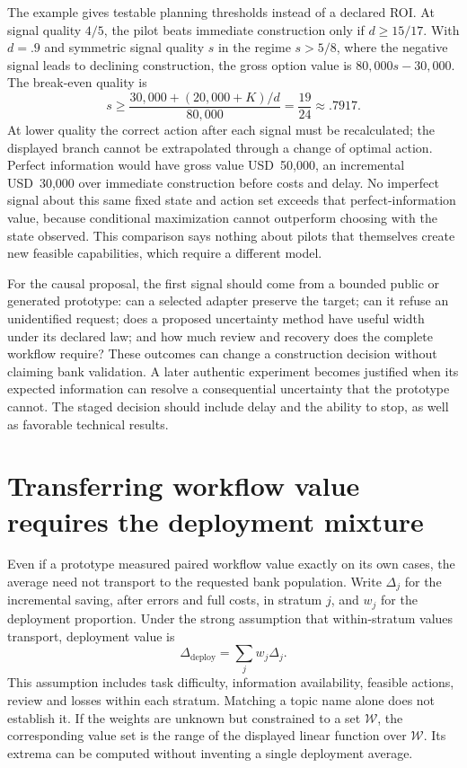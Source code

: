 The example gives testable planning thresholds instead of a declared ROI.
At signal quality $4/5$, the pilot beats immediate construction only if
$d\geq15/17$. With $d=.9$ and symmetric signal quality $s$ in the regime
$s>5/8$, where the negative signal leads to declining construction, the gross
option value is $80{,}000s-30{,}000$. The break-even quality is
\[
 s\geq \frac{30{,}000+(20{,}000+K)/d}{80{,}000}
       =\frac{19}{24}\approx.7917.
\]
At lower quality the correct action after each signal must be recalculated;
the displayed branch cannot be extrapolated through a change of optimal action.
Perfect information would have gross value USD~50,000, an incremental
USD~30,000 over immediate construction before costs and delay. No imperfect
signal about this same fixed state and action set exceeds that perfect-information
value, because conditional maximization cannot outperform choosing with the
state observed. This comparison says nothing about pilots that themselves
create new feasible capabilities, which require a different model.
\citep{exec14_l8_economics}

For the causal proposal, the first signal should come from a bounded public or
generated prototype: can a selected adapter preserve the target; can it refuse
an unidentified request; does a proposed uncertainty method have useful width
under its declared law; and how much review and recovery does the complete
workflow require? These outcomes can change a construction decision without
claiming bank validation. A later authentic experiment becomes justified when
its expected information can resolve a consequential uncertainty that the
prototype cannot. The staged decision should include delay and the ability to
stop, as well as favorable technical results. \citep{exec14_l8_design}

\section{Transferring workflow value requires the deployment mixture}
\label{exec14:l8-transfer}

Even if a prototype measured paired workflow value exactly on its own cases,
the average need not transport to the requested bank population. Write
$\Delta_j$ for the incremental saving, after errors and full costs, in stratum
$j$, and $w_j$ for the deployment proportion. Under the strong assumption that
within-stratum values transport, deployment value is
\[
 \Delta_{\mathrm{deploy}}=\sum_j w_j\Delta_j.
\]
This assumption includes task difficulty, information availability, feasible
actions, review and losses within each stratum. Matching a topic name alone
does not establish it. If the weights are unknown but constrained to a set
$\mathcal W$, the corresponding value set is the range of the displayed linear
function over $\mathcal W$. Its extrema can be computed without inventing a
single deployment average. \citep{exec14_l8_economics}

